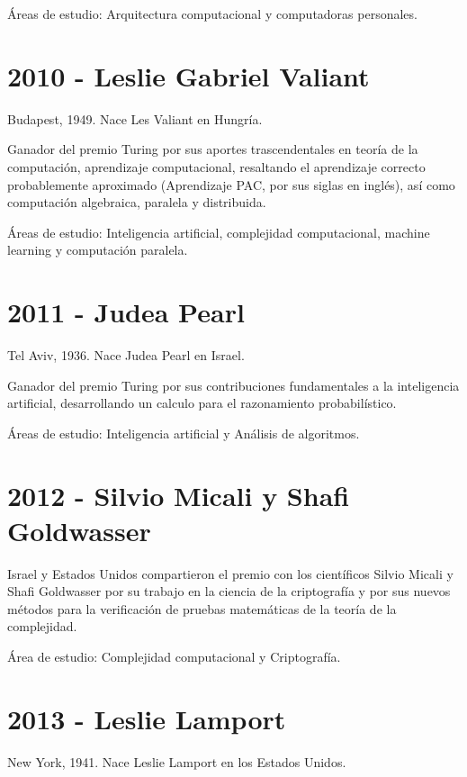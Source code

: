 \documentclass[notitlepage,letterpaper, 11pt]{article}
\begin{document}
\noindent Áreas de estudio: Arquitectura computacional y computadoras personales.
\newline

\section*{2010 - Leslie Gabriel Valiant}
\noindent Budapest, 1949. Nace Les Valiant en Hungría.

\noindent Ganador del premio Turing por sus aportes trascendentales en teoría de la computación, aprendizaje computacional, resaltando el aprendizaje correcto probablemente aproximado (Aprendizaje PAC, por sus siglas en inglés), así como computación algebraica, paralela y distribuida.

\noindent Áreas de estudio: Inteligencia artificial, complejidad computacional, machine learning y computación paralela.
\newline

\section*{2011 - Judea Pearl}
\noindent Tel Aviv, 1936. Nace Judea Pearl en Israel.

\noindent Ganador del premio Turing por sus contribuciones fundamentales a la inteligencia artificial, desarrollando un calculo para el razonamiento probabilístico.

\noindent Áreas de estudio: Inteligencia artificial y Análisis de algoritmos.
\newline

\section*{2012 - Silvio Micali y Shafi Goldwasser}
\noindent Israel y Estados Unidos compartieron el premio con los científicos Silvio Micali y Shafi Goldwasser por su trabajo en la ciencia de la criptografía y por sus nuevos métodos para la verificación de pruebas matemáticas de la teoría de la complejidad.

\noindent Área de estudio: Complejidad computacional y Criptografía.
\newline

\section*{2013 - Leslie Lamport}
\noindent New York, 1941. Nace Leslie Lamport en los Estados Unidos.
\end{document}
